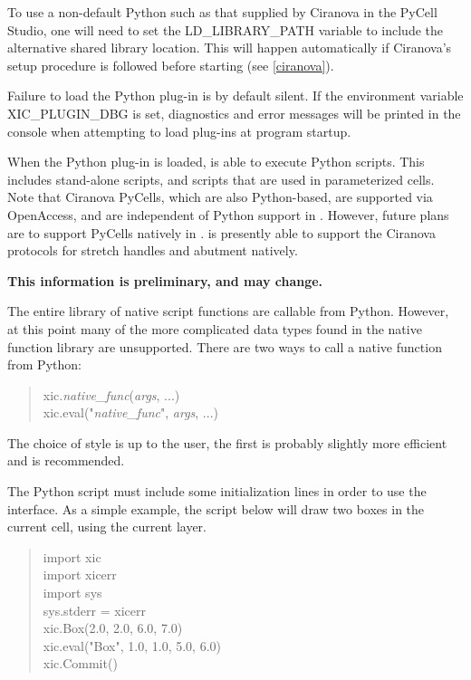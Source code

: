 \begin{itemize}
To use a non-default Python such as that supplied by Ciranova in the
PyCell Studio, one will need to set the {\et LD\_LIBRARY\_PATH}
variable to include the alternative shared library location.
This will happen automatically if Ciranova's setup procedure is
followed before starting {\Xic} (see \ref{ciranova}).

Failure to load the Python plug-in is by default silent.  If the
environment variable {\vt XIC\_PLUGIN\_DBG} is set, diagnostics and
error messages will be printed in the console when attempting to load
plug-ins at program startup.

When the Python plug-in is loaded, {\Xic} is able to execute Python
scripts.  This includes stand-alone scripts, and scripts that are used
in parameterized cells.  Note that Ciranova PyCells, which are also
Python-based, are supported via OpenAccess, and are independent of
Python support in {\Xic}.  However, future plans are to support
PyCells natively in {\Xic}.  {\Xic} is presently able to support the
Ciranova protocols for stretch handles and abutment natively.

{\bf This information is preliminary, and may change.}

The entire library of native script functions are callable from
Python.  However, at this point many of the more complicated data
types found in the native function library are unsupported.  There are
two ways to call a native function from Python:

\begin{quote}
{\vt xic.}{\it native\_func\/}{\vt (}{\it args\/}, ...{\vt )}\\
{\vt xic.eval}{\vt ("}{\it native\_func\/}{\vt ",} {\it args\/}, {\vt ...)}
\end{quote}

The choice of style is up to the user, the first is probably slightly
more efficient and is recommended.

The Python script must include some initialization lines in order to
use the {\Xic} interface.  As a simple example, the script below will
draw two boxes in the current cell, using the current layer.

\begin{quote}\vt
import xic\\
import xicerr\\
import sys\\
sys.stderr = xicerr\\
xic.Box(2.0, 2.0, 6.0, 7.0)\\
xic.eval("Box", 1.0, 1.0, 5.0, 6.0)\\
xic.Commit()\\
\end{quote}


\end{itemize}
